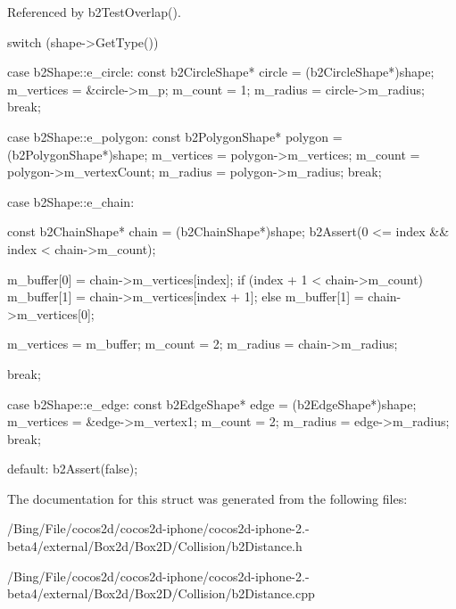 Referenced by b2\-Test\-Overlap().


\begin{DoxyCode}
{
        switch (shape->GetType())
        {
        case b2Shape::e_circle:
                {
                        const b2CircleShape* circle = (b2CircleShape*)shape;
                        m_vertices = &circle->m_p;
                        m_count = 1;
                        m_radius = circle->m_radius;
                }
                break;

        case b2Shape::e_polygon:
                {
                        const b2PolygonShape* polygon = (b2PolygonShape*)shape;
                        m_vertices = polygon->m_vertices;
                        m_count = polygon->m_vertexCount;
                        m_radius = polygon->m_radius;
                }
                break;

        case b2Shape::e_chain:
                {
                        const b2ChainShape* chain = (b2ChainShape*)shape;
                        b2Assert(0 <= index && index < chain->m_count);

                        m_buffer[0] = chain->m_vertices[index];
                        if (index + 1 < chain->m_count)
                        {
                                m_buffer[1] = chain->m_vertices[index + 1];
                        }
                        else
                        {
                                m_buffer[1] = chain->m_vertices[0];
                        }

                        m_vertices = m_buffer;
                        m_count = 2;
                        m_radius = chain->m_radius;
                }
                break;

        case b2Shape::e_edge:
                {
                        const b2EdgeShape* edge = (b2EdgeShape*)shape;
                        m_vertices = &edge->m_vertex1;
                        m_count = 2;
                        m_radius = edge->m_radius;
                }
                break;

        default:
                b2Assert(false);
        }
}
\end{DoxyCode}


The documentation for this struct was generated from the following files\-:\begin{DoxyCompactItemize}
\item 
/\-Bing/\-File/cocos2d/cocos2d-\/iphone/cocos2d-\/iphone-\/2.-\/beta4/external/\-Box2d/\-Box2\-D/\-Collision/b2\-Distance.\-h\item 
/\-Bing/\-File/cocos2d/cocos2d-\/iphone/cocos2d-\/iphone-\/2.-\/beta4/external/\-Box2d/\-Box2\-D/\-Collision/b2\-Distance.\-cpp\end{DoxyCompactItemize}
